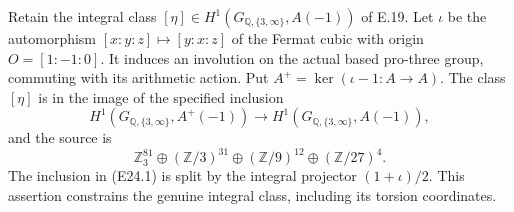 \begin{proposition}
\label{E-integral-symmetry}
Retain the integral class $[\eta]\in H^1(G_{\mathbb Q,\{3,\infty\}},
A(-1))$ of E.19. Let $\iota$ be the automorphism
$[x:y:z]\mapsto[y:x:z]$ of the Fermat cubic with origin
$O=[1:-1:0]$. It induces an involution on the actual
based pro-three group, commuting with its arithmetic action.
Put $A^+=\ker(\iota-1:A\to A)$. The class $[\eta]$
is in the image of the specified inclusion
\[
 H^1(G_{\mathbb Q,\{3,\infty\}},A^+(-1))
 \longrightarrow H^1(G_{\mathbb Q,\{3,\infty\}},A(-1)),
 \tag{E24.1}
\]
and the source is
\[
 \mathbb Z_3^{81}\oplus
 (\mathbb Z/3)^{31}\oplus
 (\mathbb Z/9)^{12}\oplus
 (\mathbb Z/27)^4.\tag{E24.2}
\]
The inclusion in (E24.1) is split by the integral projector
$(1+\iota)/2$. This assertion constrains the genuine
integral class, including its torsion coordinates.
\end{proposition}

